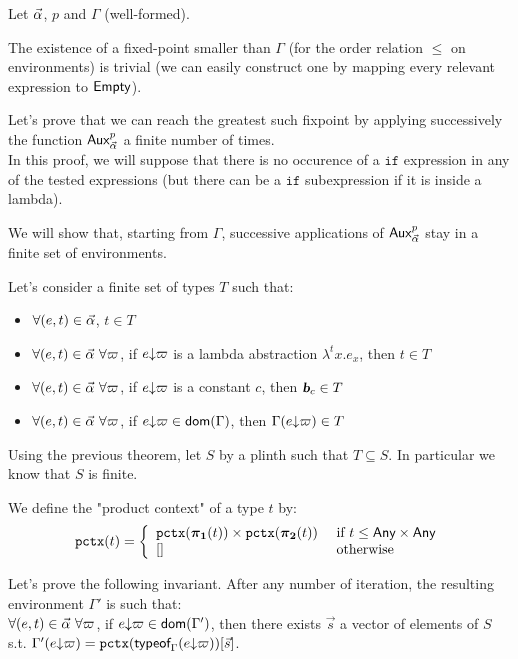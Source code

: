\documentclass[a4paper]{article}
\theoremstyle{definition}
\begin{document}
    Let $\vec \alpha$, $p$ and $\Gamma$ (well-formed).

    The existence of a fixed-point smaller than $\Gamma$ (for the order relation $\leq$ on environments) is trivial
    (we can easily construct one by mapping every relevant expression to $\textsf{Empty}$).

    Let's prove that we can reach the greatest such fixpoint by applying successively the function $\textsf{Aux}^{p}_{\vec \alpha}$ a finite number of times.\\
    In this proof, we will suppose that there is no occurence of a $\texttt{if}$ expression in any of the tested expressions
    (but there can be a $\texttt{if}$ subexpression if it is inside a lambda).

    We will show that, starting from $\Gamma$, successive applications of $\textsf{Aux}^{p}_{\vec \alpha}$ stay in a finite set of environments.

    Let's consider a finite set of types $T$ such that:
    \begin{itemize}
      \item $\forall (e,t) \in \vec \alpha$, $t \in T$
      \item $\forall (e,t) \in \vec \alpha\ \forall \varpi$, if $e{\downarrow}\varpi$ is a lambda abstraction $\lambda^tx.e_x$, then $t \in T$
      \item $\forall (e,t) \in \vec \alpha\ \forall \varpi$, if $e{\downarrow}\varpi$ is a constant $c$, then $\basic{c} \in T$
      \item $\forall (e,t) \in \vec \alpha\ \forall \varpi$, if $e{\downarrow}\varpi \in \textsf{dom}(\Gamma)$, then $\Gamma(e{\downarrow}\varpi) \in T$
    \end{itemize}

    Using the previous theorem, let $S$ by a plinth such that $T \subseteq S$. In particular we know that $S$ is finite.

    We define the "product context" of a type $t$ by:
    \[
      \texttt{pctx}(t)=\left\{
        \begin{array}{ll}
          \texttt{pctx}(\boldsymbol{\pi}_{\boldsymbol 1}(t))\times \texttt{pctx}(\boldsymbol{\pi}_{\boldsymbol 2}(t)) & \text{ if } t \leq \textsf{Any}\times \textsf{Any}\\
          {[}] & \text{ otherwise}
        \end{array}  
      \right.
    \]

    Let's prove the following invariant. After any number of iteration, the resulting environment $\Gamma'$ is such that:\\
    $\forall (e,t) \in \vec \alpha\ \forall \varpi$, if $e{\downarrow}\varpi \in \textsf{dom}(\Gamma')$, then there exists $\vec s$ a vector of elements of $S$ s.t. $\Gamma'(e{\downarrow}\varpi) = \texttt{pctx}(\textsf{typeof}_{\Gamma}(e{\downarrow}\varpi))[\vec s]$.
    
\end{document}
